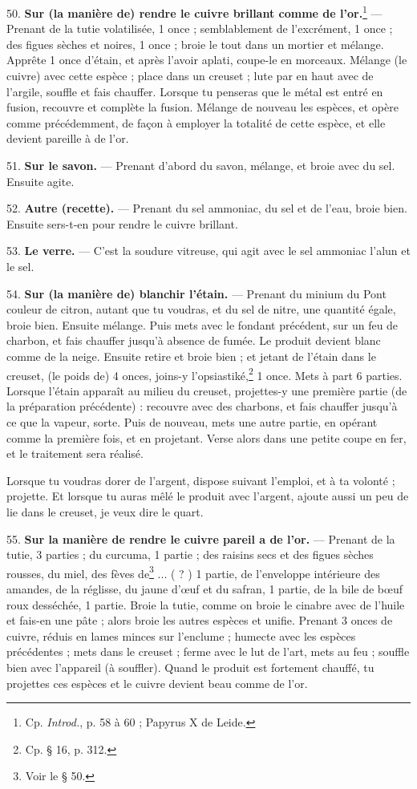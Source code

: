 \documentclass[a4paper, 11pt, oneside, polutonikogreek, french]{article}
\begin{document}
50. \textbf{Sur (la manière de) rendre le cuivre brillant comme de l'or.}\footnote{Cp. \emph{Introd.}, p. 58 à 60 ; Papyrus X de Leide.} --- Prenant de la tutie volatilisée, 1 once ; semblablement de l'excrément, 1 once ; des figues sèches et noires, 1 once ; broie le tout dans un mortier et mélange. Apprête 1 once d'étain, et après l'avoir aplati, coupe-le en morceaux. Mélange (le cuivre) avec cette espèce ; place dans un creuset ; lute par en haut avec de l'argile, souffle et fais chauffer. Lorsque tu penseras que le métal est entré en fusion, recouvre et complète la fusion. Mélange de nouveau les espèces, et opère comme précédemment, de façon à employer la totalité de cette espèce, et elle devient pareille à de l'or.

51. \textbf{Sur le savon.} --- Prenant d'abord du savon, mélange, et broie avec du sel. Ensuite agite.

52. \textbf{Autre (recette).} --- Prenant du sel ammoniac, du sel et de l'eau, broie bien. Ensuite sers-t-en pour rendre le cuivre brillant.

53. \textbf{Le verre.} --- C'est la soudure vitreuse, qui agit avec le sel ammoniac l'alun et le sel.

54. \textbf{Sur (la manière de) blanchir l'étain.} --- Prenant du minium du Pont couleur de citron, autant que tu voudras, et du sel de nitre, une quantité égale, broie bien. Ensuite mélange. Puis mets avec le fondant précédent, sur un feu de charbon, et fais chauffer jusqu'à absence de fumée. Le produit devient blanc comme de la neige. Ensuite retire et broie bien ; et jetant de l'étain dans le creuset, (le poids de) 4 onces, joins-y l'opsiastiké,\footnote{Cp. § 16, p. 312.} 1 once. Mets à part 6 parties. Lorsque l'étain apparaît au milieu du creuset, projettes-y une première partie (de la préparation précédente) : recouvre avec des charbons, et fais chauffer jusqu'à ce que la vapeur, sorte. Puis de nouveau, mets une autre partie, en opérant comme la première fois, et en projetant. Verse alors dans une petite coupe en fer, et le traitement sera réalisé.

Lorsque tu voudras dorer de l'argent, dispose suivant l'emploi, et à ta volonté ; projette. Et lorsque tu auras mêlé le produit avec l'argent, ajoute aussi un peu de lie dans le creuset, je veux dire le quart.

55. \textbf{Sur la manière de rendre le cuivre pareil a de l'or.} --- Prenant de la tutie, 3 parties ; du curcuma, 1 partie ; des raisins secs et des figues sèches rousses, du miel, des fèves de\footnote{Voir le § 50.} ... ( ? ) 1 partie, de l'enveloppe intérieure des amandes, de la réglisse, du jaune d'œuf et du safran, 1 partie, de la bile de bœuf roux desséchée, 1 partie. Broie la tutie, comme on broie le cinabre avec de l'huile et fais-en une pâte ; alors broie les autres espèces et unifie. Prenant 3 onces de cuivre, réduis en lames minces sur l'enclume ; humecte avec les espèces précédentes ; mets dans le creuset ; ferme avec le lut de l'art, mets au feu ; souffle bien avec l'appareil (à souffler). Quand le produit est fortement chauffé, tu projettes ces espèces et le cuivre devient beau comme de l'or.
\end{document}
